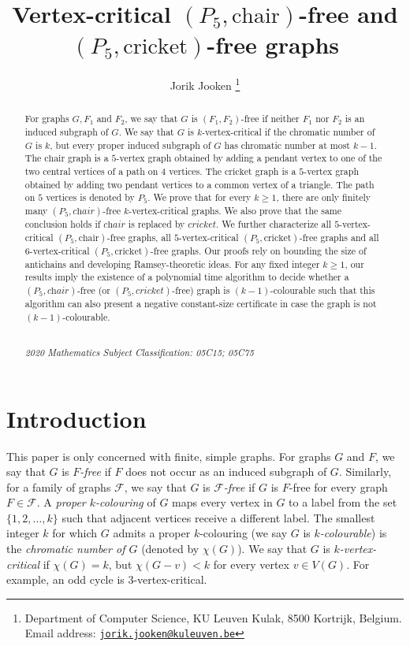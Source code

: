 \documentclass[10pt]{article}
\date{ }
\title{\bf Vertex-critical $(P_5,\text{chair})$-free and $(P_5,\text{cricket})$-free graphs}
\author{
Jorik Jooken \thanks{Department of Computer Science, KU Leuven Kulak, 8500 Kortrijk, Belgium.\\ Email address:
 \protect\href{mailto:jorik.jooken@kuleuven.be}{\protect\nolinkurl{jorik.jooken@kuleuven.be}}
}}
\date{}
\theoremstyle{definition}
\begin{document}
	
	\maketitle

	 \begin{abstract}
For graphs $G, F_1$ and $F_2$, we say that $G$ is $(F_1,F_2)$-free if neither $F_1$ nor $F_2$ is an induced subgraph of $G$. We say that $G$ is $k$-vertex-critical if the chromatic number of $G$ is $k$, but every proper induced subgraph of $G$ has chromatic number at most $k-1$. The $\text{chair}$ graph is a $5$-vertex graph obtained by adding a pendant vertex to one of the two central vertices of a path on $4$ vertices. The $\text{cricket}$ graph is a $5$-vertex graph obtained by adding two pendant vertices to a common vertex of a triangle. The path on $5$ vertices is denoted by $P_5$. We prove that for every $k \geq 1$, there are only finitely many $(P_5,\textit{chair})$-free $k$-vertex-critical graphs. We also prove that the same conclusion holds if $\textit{chair}$ is replaced by $\textit{cricket}$. We further characterize all $5$-vertex-critical $(P_5,\text{chair})$-free graphs, all $5$-vertex-critical $(P_5,\text{cricket})$-free graphs and all $6$-vertex-critical $(P_5,\text{cricket})$-free graphs. Our proofs rely on bounding the size of antichains and developing Ramsey-theoretic ideas. For any fixed integer $k \geq 1$, our results imply the existence of a polynomial time algorithm to decide whether a $(P_5,\textit{chair})$-free (or $(P_5,\textit{cricket})$-free) graph is $(k-1)$-colourable such that this algorithm can also present a negative constant-size certificate in case the graph is not $(k-1)$-colourable.

			\vskip 3mm
		
				 \\
				\noindent \textit{2020 Mathematics Subject Classification: 05C15; 05C75} 
			\end{abstract}


\section{Introduction}

 This paper is only concerned with finite, simple graphs. For graphs $G$ and $F$, we say that $G$ is \textit{$F$-free} if $F$ does not occur as an induced subgraph of $G$. Similarly, for a family of graphs $\mathcal{F}$, we say that $G$ is \textit{$\mathcal{F}$-free} if $G$ is $F$-free for every graph $F \in \mathcal{F}$. A \textit{proper $k$-colouring} of $G$ maps every vertex in $G$ to a label from the set $\{1,2,\ldots,k\}$ such that adjacent vertices receive a different label. The smallest integer $k$ for which $G$ admits a proper $k$-colouring (we say $G$ is \textit{$k$-colourable}) is the \textit{chromatic number of $G$} (denoted by $\chi(G)$). We say that $G$ is \textit{$k$-vertex-critical} if $\chi(G)=k$, but $\chi(G-v)<k$ for every vertex $v \in V(G)$. For example, an odd cycle is $3$-vertex-critical.
\end{document}
